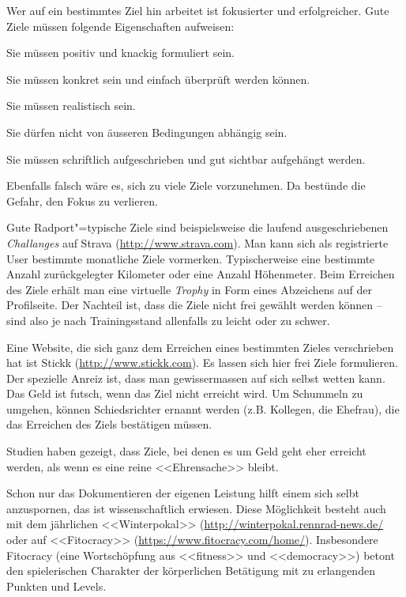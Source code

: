 \documentclass[a4paper,DIV13,BCOR0cm,draft=TRUE]{scrartcl}
\begin{document}
Wer auf ein bestimmtes Ziel hin arbeitet ist fokusierter und erfolgreicher.
Gute Ziele müssen folgende Eigenschaften aufweisen:

\begin{itemize*}
  \item Sie müssen positiv und knackig formuliert sein.
  \item Sie müssen konkret sein und einfach überprüft werden können.
  \item Sie müssen realistisch sein.
  \item Sie dürfen nicht von äusseren Bedingungen abhängig sein.
  \item Sie müssen schriftlich aufgeschrieben und gut sichtbar aufgehängt werden.
\end{itemize*}

Ebenfalls falsch wäre es, sich zu viele Ziele vorzunehmen.
Da bestünde die Gefahr, den Fokus zu verlieren.

Gute Radport"=typische Ziele sind beispielsweise die laufend ausgeschriebenen
\textsl{Challanges} auf Strava (\url{http://www.strava.com}).
Man kann sich als registrierte User bestimmte monatliche Ziele vormerken.
Typischerweise eine bestimmte Anzahl zurückgelegter Kilometer oder eine Anzahl Höhenmeter.
Beim Erreichen des Ziele erhält man eine virtuelle \textsl{Trophy} in Form eines Abzeichens auf der Profilseite.
Der Nachteil ist, dass die Ziele nicht frei gewählt werden können --
sind also je nach Trainingsstand allenfalls zu leicht oder zu schwer.

Eine Website, die sich ganz dem Erreichen eines bestimmten Zieles verschrieben hat
ist Stickk (\url{http://www.stickk.com}).
Es lassen sich hier frei Ziele formulieren.
Der spezielle Anreiz ist, dass man gewissermassen auf sich selbst wetten kann.
Das Geld ist futsch, wenn das Ziel nicht erreicht wird.
Um Schummeln zu umgehen, können Schiedsrichter ernannt werden (z.B. Kollegen, die Ehefrau), die das Erreichen des Ziels bestätigen müssen.

Studien haben gezeigt, dass Ziele, bei denen es um Geld geht eher erreicht werden, als wenn es eine reine <<Ehrensache>> bleibt.

Schon nur das Dokumentieren der eigenen Leistung hilft einem sich selbt anzuspornen,
das ist wissenschaftlich erwiesen.
Diese Möglichkeit besteht auch mit dem jährlichen <<Winterpokal>> (\url{http://winterpokal.rennrad-news.de/} oder
auf <<Fitocracy>> (\url{https://www.fitocracy.com/home/}).
Insbesondere Fitocracy
(eine Wortschöpfung aus <<fitness>> und <<democracy>>)
betont den spielerischen Charakter der körperlichen Betätigung mit zu erlangenden Punkten und Levels.
\end{document}
